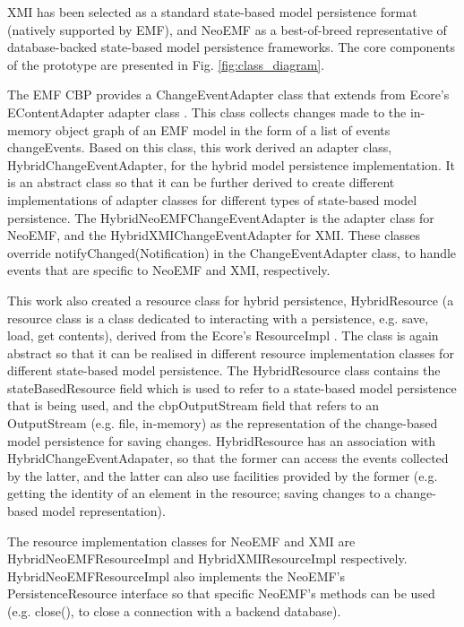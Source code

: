 XMI has been selected as a standard state-based model persistence format (natively supported by EMF), and NeoEMF as a best-of-breed representative of database-backed state-based model persistence frameworks. The core components of the prototype are presented in Fig. \ref{fig:class_diagram}. 

The EMF CBP provides a \textsf{ChangeEventAdapter} class \cite{DBLP:conf/models/YohannisKP17} that extends from Ecore's \textsf{EContentAdapter} adapter class \cite{eclipse2018eContentAdapter}
. This class collects changes made to the in-memory object graph of an EMF model in the form of a list of events \textsf{changeEvents}. Based on this class, this work derived an adapter class, \textsf{HybridChangeEventAdapter}, for the hybrid model persistence implementation. It is an abstract class so that it can be further derived to create different implementations of adapter classes for different types of state-based model persistence. The \textsf{HybridNeoEMFChangeEventAdapter} is the adapter class for NeoEMF, and the \textsf{HybridXMIChangeEventAdapter} for XMI. These classes override \textsf{notifyChanged}(\textsf{Notification}) in the \textsf{ChangeEventAdapter} class, to handle events that are specific to NeoEMF and XMI, respectively.

This work also created a resource class for hybrid persistence, \textsf{HybridResource} (a resource class is a class dedicated to interacting with a persistence, e.g. save, load, get contents), derived from the Ecore's \textsf{ResourceImpl} \cite{eclipse2018resourceImpl}
. The class is again abstract so that it can be realised in different resource implementation classes for different state-based model persistence. The \textsf{HybridResource} class contains the \textsf{stateBasedResource} field which is used to refer to a state-based model persistence that is being used, and the \textsf{cbpOutputStream} field that refers to an \textsf{OutputStream} (e.g. file, in-memory) as the representation of the change-based model persistence for saving changes. \textsf{HybridResource} has an association with \textsf{HybridChangeEventAdapater}, so that the former can access the events collected by the latter, and the latter can also use facilities provided by the former (e.g. getting the identity of an element in the resource; saving changes to a change-based model representation).

The resource implementation classes for NeoEMF and XMI are \textsf{HybridNeoEMFResourceImpl} and \textsf{HybridXMIResourceImpl} respectively. \textsf{HybridNeoEMFResourceImpl} also implements the NeoEMF's \textsf{PersistenceResource} interface \cite{atlanmod2018persistentResource}
so that specific NeoEMF's methods can be used (e.g. \textsf{close}(), to close a connection with a backend database).

